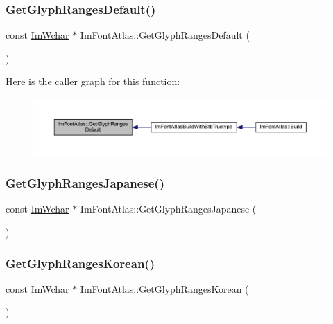 \subsubsection{\texorpdfstring{Get\+Glyph\+Ranges\+Default()}{GetGlyphRangesDefault()}}
{\footnotesize\ttfamily const \mbox{\hyperlink{imgui_8h_af2c7badaf05a0008e15ef76d40875e97}{Im\+Wchar}} $\ast$ Im\+Font\+Atlas\+::\+Get\+Glyph\+Ranges\+Default (\begin{DoxyParamCaption}{ }\end{DoxyParamCaption})}

Here is the caller graph for this function\+:
\nopagebreak
\begin{figure}[H]
\begin{center}
\leavevmode
\includegraphics[width=350pt]{struct_im_font_atlas_adec0df140eb1dc01c2a22a5253d62820_icgraph}
\end{center}
\end{figure}
\mbox{\label{struct_im_font_atlas_a2654afbbf73835bf08278cdc6c181a96}} 
\subsubsection{\texorpdfstring{Get\+Glyph\+Ranges\+Japanese()}{GetGlyphRangesJapanese()}}
{\footnotesize\ttfamily const \mbox{\hyperlink{imgui_8h_af2c7badaf05a0008e15ef76d40875e97}{Im\+Wchar}} $\ast$ Im\+Font\+Atlas\+::\+Get\+Glyph\+Ranges\+Japanese (\begin{DoxyParamCaption}{ }\end{DoxyParamCaption})}

\mbox{\label{struct_im_font_atlas_ac70e07bd35913661c8fc50413b3bf969}} 
\subsubsection{\texorpdfstring{Get\+Glyph\+Ranges\+Korean()}{GetGlyphRangesKorean()}}
{\footnotesize\ttfamily const \mbox{\hyperlink{imgui_8h_af2c7badaf05a0008e15ef76d40875e97}{Im\+Wchar}} $\ast$ Im\+Font\+Atlas\+::\+Get\+Glyph\+Ranges\+Korean (\begin{DoxyParamCaption}{ }\end{DoxyParamCaption})}

